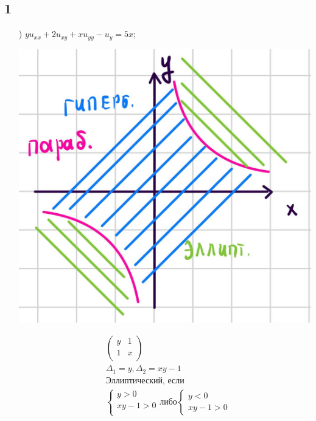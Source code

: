 \subsection{1}
\begin{enumerate}
  \item[\text{a})]  $yu_{xx}+2u_{xy}+xu_{yy}-u_{y}=5x;$ \\
    \noindent\begin{minipage}{0.5\textwidth}
  \includegraphics[width=1\linewidth]{pictures/u1.jpg} 
\end{minipage}
\hfill
\begin{minipage}{0.6\textwidth}\raggedleft
\begin{align*}
&\begin{pmatrix}
  y & 1 \\
  1 & x \\
\end{pmatrix} \\
&\Delta_{1} = y, \Delta_{2}=xy-1 \\
&\text{Эллиптический, если} \\ 
& \begin{cases}
 y > 0\\ xy-1>0 \\ 
\end{cases} \text{либо} \begin{cases}
  y < 0\\ xy-1>0
\end{cases}\\

\end{align*}
\end{minipage}
\end{enumerate}
